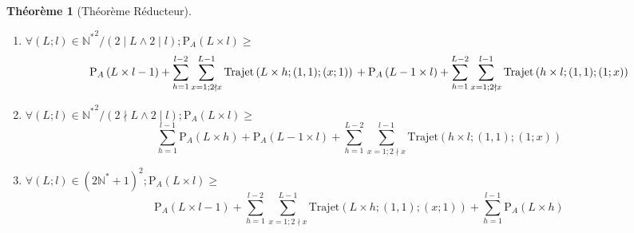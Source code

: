\documentclass[twoside, a4paper, 12pt]{report}
\newtheorem{theorem}{Théorème}[chapter]
\newcommand{\trajet}[6]{\ensuremath{\text{Trajet}\left(#1 \times #2; (#3, #4); (#5; #6)\right)}}
\newcommand{\pa}[2]{\ensuremath{\text{P}_A\left(#1 \times #2\right)}}
\begin{document}
\begin{theorem}[Théorème Réducteur]
\begin{enumerate}
\begin{enumerate}
\item $ \forall (L; l) \in \mathbb{N^*}^2 / (2\mid L \land 2\mid l) ; \pa{L}{l} \geq$
\[ \pa{L}{l-1} + \sum_{h=1}^{l-2}\sum_{x=1; 2 \nmid x}^{L-1} \trajet{L}{h}{1}{1}{x}{1} \\
+ \pa{L-1}{l} + \sum_{h=1}^{L-2}\sum_{x=1; 2 \nmid x}^{l-1} \trajet{h}{l}{1}{1}{1}{x}\]

\item $ \forall (L; l) \in \mathbb{N^*}^2 / (2\nmid L \land 2\mid l); \pa{L}{l} \geq$
\[  \sum_{h=1}^{l-1}\pa{L}{h} + \pa{L-1}{l} + \sum_{h=1}^{L-2}\sum_{x=1; 2 \nmid x}^{l-1} \trajet{h}{l}{1}{1}{1}{x}\]

\item $ \forall (L; l) \in (2\mathbb{N^*} + 1)^2; \pa{L}{l} \geq$
\[  \pa{L}{l-1} + \sum_{h=1}^{l-2}\sum_{x=1; 2 \nmid x}^{L-1} \trajet{L}{h}{1}{1}{x}{1} + \sum_{h=1}^{l-1}\pa{L}{h}\]
\end{enumerate}

\end{enumerate}
\end{theorem}
\end{document}
